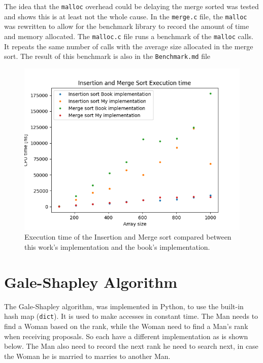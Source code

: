 \documentclass[a4paper,12pt,twocolumn]{article}
\begin{document}
The idea that the \verb|malloc| overhead could be delaying the merge sorted was tested and shows this is at least not the whole cause.
In the \verb|merge.c| file, the \verb|malloc| was rewritten to allow for the benchmark library to record the amount of time and  memory allocated.
The \verb|malloc.c| file runs a benchmark of the \verb|malloc| calls.
It repeats the same number of calls with the average size allocated in the merge sort.
The result of this benchmark is also in the \verb|Benchmark.md| file

\begin{figure}[htbp]
	\centering
	\includegraphics[width=\linewidth]{Fig/Insertion_Merge_comp.png}
	\caption{Execution time of the Insertion and Merge sort compared between this work's implementation and the book's implementation.}
\end{figure}



\section{Gale-Shapley Algorithm}
\label{sec:gale-shapley}

The Gale-Shapley algorithm, was implemented in Python, to use the built-in hash map (\texttt{dict}).
It is used to make accesses in constant time.
The Man needs to find a Woman based on the rank, while the Woman need to find a Man's rank when receiving proposals. 
So each have a different implementation as is shown below.
The Man also need to record the next rank he need to search next, 
in case the Woman he is married to marries to another Man.
\end{document}
